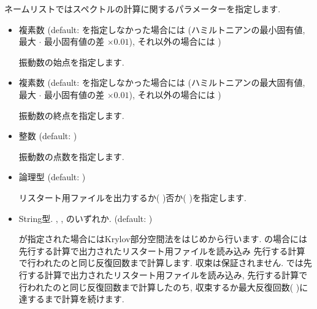 \documentclass[letterpaper,10pt,dvipdfmx,openany]{sphinxmanual}
\begin{document}
 ネームリストではスペクトルの計算に関するパラメーターを指定します.
\begin{itemize}
\item {} 

 複素数 (default:  を指定しなかった場合には
(ハミルトニアンの最小固有値,
最大 \(\cdot\) 最小固有値の差 \(\times0.01\)),
それ以外の場合には )

 振動数の始点を指定します.

\item {} 

 複素数 (default:  を指定しなかった場合には
(ハミルトニアンの最大固有値,
最大 \(\cdot\) 最小固有値の差 \(\times0.01\)),
それ以外の場合には )

 振動数の終点を指定します.

\item {} 

 整数 (default: )

 振動数の点数を指定します.

\item {} 

 論理型 (default: )

リスタート用ファイルを出力するか( )否か( )を指定します.

\item {} 

String型.  , ,  のいずれか.
(default: )

 が指定された場合にはKrylov部分空間法をはじめから行います.
 の場合には先行する計算で出力されたリスタート用ファイルを読み込み
先行する計算で行われたのと同じ反復回数まで計算します. 収束は保証されません.
 では先行する計算で出力されたリスタート用ファイルを読み込み,
先行する計算で行われたのと同じ反復回数まで計算したのち,
収束するか最大反復回数( )に達するまで計算を続けます.

\end{itemize}
\end{document}
